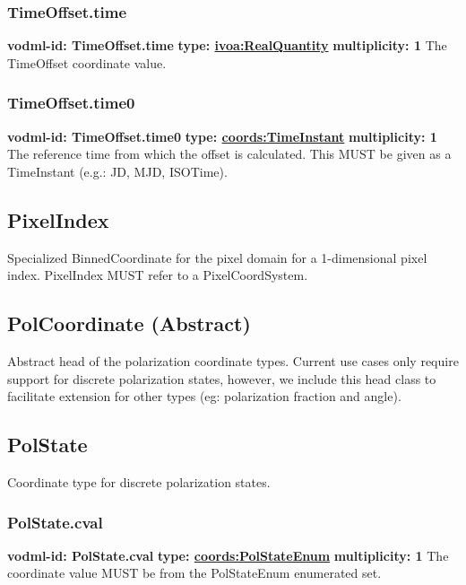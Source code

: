     \subsubsection{TimeOffset.time}
      \textbf{vodml-id: TimeOffset.time} \newline
      \textbf{type: \hyperref[sect:ivoa]{ivoa:RealQuantity}} \newline
      \textbf{multiplicity: 1} \newline 
      The TimeOffset coordinate value.

    \subsubsection{TimeOffset.time0}
      \textbf{vodml-id: TimeOffset.time0} \newline
      \textbf{type: \hyperref[sect:TimeInstant]{coords:TimeInstant}} \newline
      \textbf{multiplicity: 1} \newline 
      The reference time from which the offset is calculated. This MUST be given as a TimeInstant (e.g.: JD, MJD, ISOTime).


  \subsection{PixelIndex}
  \label{sect:PixelIndex}
    Specialized BinnedCoordinate for the pixel domain for a 1-dimensional pixel index. PixelIndex MUST refer to a PixelCoordSystem.


  \subsection{PolCoordinate (Abstract)}
  \label{sect:PolCoordinate}
    Abstract head of the polarization coordinate types. Current use cases only require support for discrete polarization states, however, we include this head class to facilitate extension for other types (eg: polarization fraction and angle).

  \subsection{PolState}
  \label{sect:PolState}
    Coordinate type for discrete polarization states.

    \subsubsection{PolState.cval}
      \textbf{vodml-id: PolState.cval} \newline
      \textbf{type: \hyperref[sect:PolStateEnum]{coords:PolStateEnum}} \newline
      \textbf{multiplicity: 1} \newline 
      The coordinate value MUST be from the PolStateEnum enumerated set.


